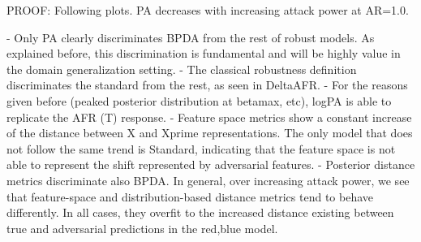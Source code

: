 PROOF: Following plots. PA decreases with increasing attack power at AR=1.0.

- Only PA clearly discriminates BPDA from the rest of robust models. As explained before, this discrimination is fundamental and will be highly value in the domain generalization setting.
- The classical robustness definition discriminates the standard from the rest, as seen in DeltaAFR.
- For the reasons given before (peaked posterior distribution at betamax, etc), logPA is able to replicate the AFR (T) response.
- Feature space metrics show a constant increase of the distance between X and Xprime representations. The only model that does not follow the same trend is Standard, indicating that the feature space is not able to represent the shift represented by adversarial features.
- Posterior distance metrics discriminate also BPDA. In general, over increasing attack power, we see that feature-space and distribution-based distance metrics tend to behave differently. In all cases, they overfit to the increased distance existing between true and adversarial predictions in the red,blue model.



